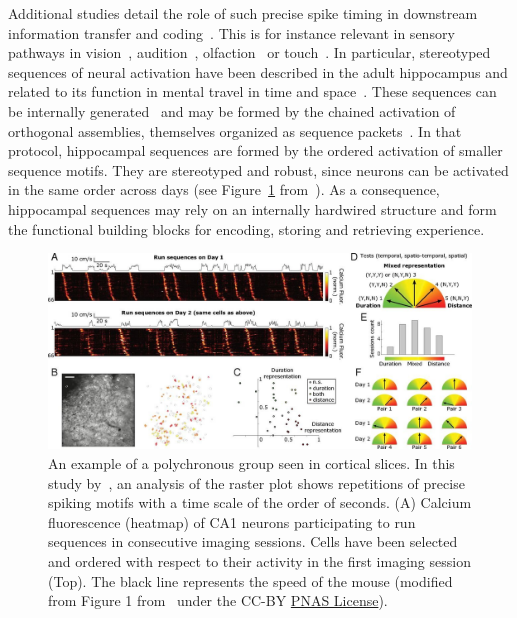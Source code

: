 \documentclass[brainsci, %
               review,submit,pdftex,moreauthors
               ]{Definitions/mdpi}
\begin{document}
Additional studies detail the role of such precise spike timing in downstream information transfer and coding~\citep{villette_internally_2015,branco_dendritic_2010,luczak_packet-based_2015}. This is for instance relevant in sensory pathways in vision~\citep{meister_concerted_1995}, audition~\citep{decharms_primary_1996}, olfaction~\citep{wehr_odour_1996} or touch~\citep{johansson_first_2004}.  In particular, stereotyped sequences of neural activation have been described in the adult hippocampus and related to its function in mental travel in time and space~\citep{buzsaki_space_2018}. These sequences can be internally generated~\citep{pastalkova_internally_2008,villette_internally_2015} and may be formed by the chained activation of orthogonal assemblies, themselves organized as sequence packets~\citep{malvache_awake_2016}. In that protocol, hippocampal sequences are formed by the ordered activation of smaller sequence motifs. They are stereotyped and robust, since neurons can be activated in the same order across days (see Figure~\ref{fig:haimerl} from~\citep{haimerl_internal_2019}). As a consequence, hippocampal sequences may rely on an internally hardwired structure and form the functional building blocks for encoding, storing and retrieving experience.
%
\begin{figure}
\centering
\includegraphics[width=\linewidth]{figures/haimerl2019.jpg}
\caption{An example of a polychronous group seen in cortical slices. In this study by~\citep{haimerl_internal_2019}, an analysis of the raster plot shows repetitions of precise spiking motifs with a time scale of the order of seconds. (A) Calcium fluorescence (heatmap) of CA1 neurons participating to run sequences in consecutive imaging sessions. Cells have been selected and ordered with respect to their activity in the first imaging session (Top). The black line represents the speed of the mouse (modified from Figure 1 from~\citep{haimerl_internal_2019} under the CC-BY \href{https://www.pnas.org/doi/full/10.1073/pnas.1718518116}{PNAS License}).}\label{fig:haimerl}
\end{figure}
\end{document}
